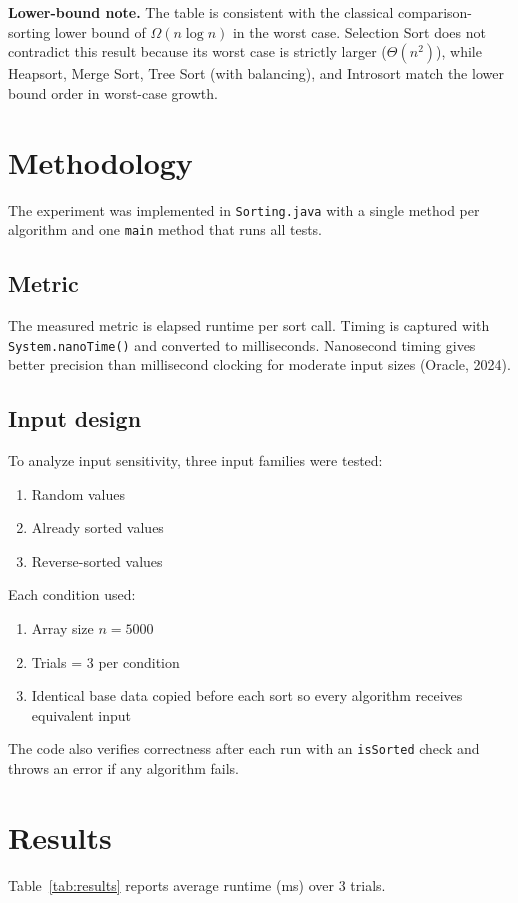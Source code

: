 \documentclass[12pt]{article}
\begin{document}
\noindent\textbf{Lower-bound note.}
The table is consistent with the classical comparison-sorting lower bound of $\Omega(n \log n)$ in the worst case. Selection Sort does not contradict this result because its worst case is strictly larger ($\Theta(n^2)$), while Heapsort, Merge Sort, Tree Sort (with balancing), and Introsort match the lower bound order in worst-case growth.

\section{Methodology}
The experiment was implemented in \texttt{Sorting.java} with a single method per algorithm and one \texttt{main} method that runs all tests.

\subsection*{Metric}
The measured metric is elapsed runtime per sort call. Timing is captured with \texttt{System.nanoTime()} and converted to milliseconds. Nanosecond timing gives better precision than millisecond clocking for moderate input sizes (Oracle, 2024).

\subsection*{Input design}
To analyze input sensitivity, three input families were tested:
\begin{enumerate}
    \item Random values
    \item Already sorted values
    \item Reverse-sorted values
\end{enumerate}

Each condition used:
\begin{enumerate}
    \item Array size $n = 5000$
    \item Trials = 3 per condition
    \item Identical base data copied before each sort so every algorithm receives equivalent input
\end{enumerate}

The code also verifies correctness after each run with an \texttt{isSorted} check and throws an error if any algorithm fails.

\section{Results}
Table~\ref{tab:results} reports average runtime (ms) over 3 trials.
\end{document}
